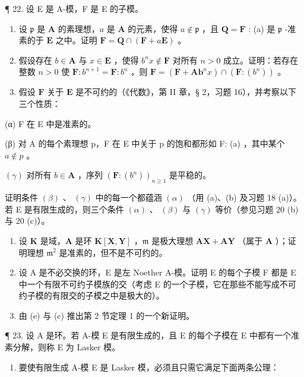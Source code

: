 ¶ 22. 设 E 是 A-模，F 是 E 的子模。

\begin{enumerate}
\def\labelenumi{(\alph{enumi})}
\item
  设 \(\mathfrak{p}\) 是 \(\mathbf{A}\) 的素理想，\(a\) 是 \(\mathbf{A}\) 的元素，使得 \(a \notin \mathfrak{p}\) ，且 \(\mathbf{Q} = \mathbf{F}\) : (a) 是 \(\mathfrak{p}\) -准素的于 \(\mathbf{E}\) 之中。证明 \(\mathbf{F} = \mathbf{Q} \cap (\mathbf{F} + a\mathbf{E})\) 。
\item
  假设存在 \(b \in \mathbf{A}\) 与 \(x \in \mathbf{E}\) ，使得 \(b^n x \notin \mathbf{F}\) 对所有 \(n > 0\) 成立。证明：若存在整数 \(n > 0\) 使 \(\mathbf{F}: b^{n+1} = \mathbf{F}: b^n\) ，则 \(\mathbf{F} = (\mathbf{F} + \mathbf{Ab}^n x) \cap (\mathbf{F}: (b^n))\) 。
\item
  假设 \(\mathbf{F}\) 关于 \(\mathbf{E}\) 是不可约的（《代数》，第 II 章，§ 2，习题 16），并考察以下三个性质：
\end{enumerate}

(α) F 在 E 中是准素的。

(β) 对 A 的每个素理想 p，F 在 E 中关于 p 的饱和都形如 F: (a) ，其中某个 \(a \notin p\) 。

\((\gamma)\) 对所有 \(b \in \mathbf{A}\) ，序列 \((\mathbf{F}:(b^n))_{n \geqslant 1}\) 是平稳的。

证明条件 \((\beta)\) 、 \((\gamma)\) 中的每一个都蕴涵 \((\alpha)\) （用 (a)、(b) 及习题 18 (a)）。若 E 是有限生成的，则三个条件 \((\alpha)\) 、 \((\beta)\) 与 \((\gamma)\) 等价（参见习题 20 (b) 与 20 (c)）。

\begin{enumerate}
\def\labelenumi{(\alph{enumi})}
\setcounter{enumi}{3}
\item
  设 \(\mathbf{K}\) 是域，\(\mathbf{A}\) 是环 \(\mathbf{K}[\mathbf{X},\mathbf{Y}]\) ，\(\mathfrak{m}\) 是极大理想 \(\mathbf{AX} + \mathbf{AY}\) （属于 \(\mathbf{A}\) ）；证明理想 \(\mathfrak{m}^2\) 是准素的，但不是不可约的。
\item
  设 A 是不必交换的环，E 是左 Noether A-模。证明 E 的每个子模 F 都是 E 中一个有限不可约子模族的交（考虑 E 的一个子模，它在那些不能写成不可约子模的有限交的子模之中是极大的）。
\item
  由 (e) 与 (c) 推出第 2 节定理 1 的一个新证明。
\end{enumerate}

¶ 23. 设 A 是环。若 A-模 E 是有限生成的，且 E 的每个子模在 E 中都有一个准素分解，则称 E 为 Lasker 模。

\begin{enumerate}
\def\labelenumi{(\alph{enumi})}
\tightlist
\item
  要使有限生成 A-模 E 是 Lasker 模，必须且只需它满足下面两条公理：
\end{enumerate}

